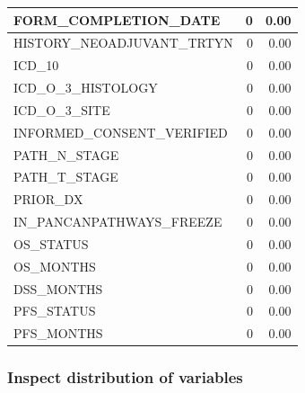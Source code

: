 \documentclass[
  11pt,
]{article}
\begin{document}
\begin{tabular}{l|r|r}
\hline
FORM\_COMPLETION\_DATE & 0 & 0.00\\
\hline
HISTORY\_NEOADJUVANT\_TRTYN & 0 & 0.00\\
\hline
ICD\_10 & 0 & 0.00\\
\hline
ICD\_O\_3\_HISTOLOGY & 0 & 0.00\\
\hline
ICD\_O\_3\_SITE & 0 & 0.00\\
\hline
INFORMED\_CONSENT\_VERIFIED & 0 & 0.00\\
\hline
PATH\_N\_STAGE & 0 & 0.00\\
\hline
PATH\_T\_STAGE & 0 & 0.00\\
\hline
PRIOR\_DX & 0 & 0.00\\
\hline
IN\_PANCANPATHWAYS\_FREEZE & 0 & 0.00\\
\hline
OS\_STATUS & 0 & 0.00\\
\hline
OS\_MONTHS & 0 & 0.00\\
\hline
DSS\_MONTHS & 0 & 0.00\\
\hline
PFS\_STATUS & 0 & 0.00\\
\hline
PFS\_MONTHS & 0 & 0.00\\
\hline
\end{tabular}

\newpage
\subsubsection{Inspect distribution of variables}
\end{document}
